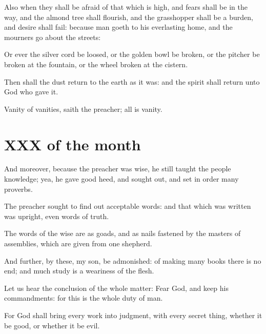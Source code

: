 \verseamended Also when they shall be afraid of that which is high, and fears shall be in the way, and the almond tree shall flourish, and the grasshopper shall be a burden, and desire shall fail: because man goeth to his everlasting home, and the mourners go about the streets:

Or ever the silver cord be loosed, or the golden bowl be broken, or the pitcher be broken at the fountain, or the wheel broken at the cistern.

Then shall the dust return to the earth as it was: and the spirit shall return unto God who gave it.

Vanity of vanities, saith the preacher; all is vanity.

\section{XXX of the month}

And moreover, because the preacher was wise, he still taught the people knowledge; yea, he gave good heed, and sought out, and set in order many proverbs.

The preacher sought to find out acceptable words: and that which was written was upright, even words of truth.

The words of the wise are as goads, and as nails fastened by the masters of assemblies, which are given from one shepherd.

And further, by these, my son, be admonished: of making many books there is no end; and much study is a weariness of the flesh.

Let us hear the conclusion of the whole matter: Fear God, and keep his commandments: for this is the whole duty of man.

For God shall bring every work into judgment, with every secret thing, whether it be good, or whether it be evil.
